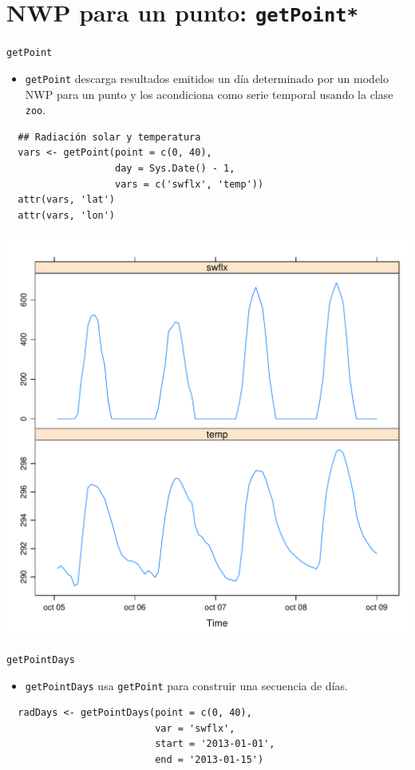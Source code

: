 \documentclass[xcolor={usenames,svgnames,dvipsnames}]{beamer}
\begin{document}
\section{NWP para un punto: \texttt{getPoint*}}
\label{sec-4}

\begin{frame}[fragile,label=sec-4-1]{\texttt{getPoint}}
 \begin{itemize}
\item \texttt{getPoint} descarga resultados emitidos un día determinado por un
modelo NWP para un \alert{punto} y los acondiciona como serie temporal
usando la clase \texttt{zoo}.
\end{itemize}

\lstset{language=R,label= ,caption= ,numbers=none}
\begin{lstlisting}
  ## Radiación solar y temperatura
  vars <- getPoint(point = c(0, 40),
                   day = Sys.Date() - 1, 
                   vars = c('swflx', 'temp'))
  attr(vars, 'lat')
  attr(vars, 'lon')
\end{lstlisting}
\end{frame}
\begin{frame}[label=sec-4-2]{}
\includegraphics[width=.9\linewidth]{figs/point.pdf}
\end{frame}

\begin{frame}[fragile,label=sec-4-3]{\texttt{getPointDays}}
 \begin{itemize}
\item \texttt{getPointDays} usa \texttt{getPoint} para construir una secuencia de días.
\end{itemize}
\lstset{language=R,label= ,caption= ,numbers=none}
\begin{lstlisting}
  radDays <- getPointDays(point = c(0, 40),
                          var = 'swflx',
                          start = '2013-01-01',
                          end = '2013-01-15')
\end{lstlisting}
\end{frame}
\end{document}
